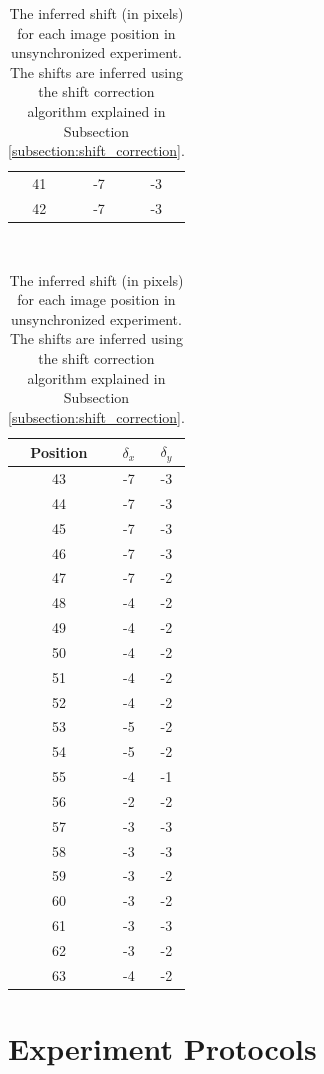 \documentclass[pdftex,12pt,a4paper]{report}
\begin{document}
\begin{appendices}
\begin{table}[H]
\begin{tabular}[t]{ c | c | c }
41 & -7 & -3
\\
42 & -7 & -3
\end{tabular}
~
\begin{tabular}[t]{ c | c | c }
Position & $\delta_x$ & $\delta_y$
\\
\hline
43 & -7 & -3
\\
44 & -7 & -3
\\
45 & -7 & -3
\\
46 & -7 & -3
\\
47 & -7 & -2
\\
48 & -4 & -2
\\
49 & -4 & -2
\\
50 & -4 & -2
\\
51 & -4 & -2
\\
52 & -4 & -2
\\
53 & -5 & -2
\\
54 & -5 & -2
\\
55 & -4 & -1
\\
56 & -2 & -2
\\
57 & -3 & -3
\\
58 & -3 & -3
\\
59 & -3 & -2
\\
60 & -3 & -2
\\
61 & -3 & -3
\\
62 & -3 & -2
\\
63 & -4 & -2
\end{tabular}
\caption{The inferred shift (in pixels) for each image position in unsynchronized experiment. The shifts are inferred using the shift correction algorithm explained in Subsection \ref{subsection:shift_correction}.}
\label{table:inferred_shift}
\end{table}


\chapter{Experiment Protocols}





\end{appendices}
\end{document}
